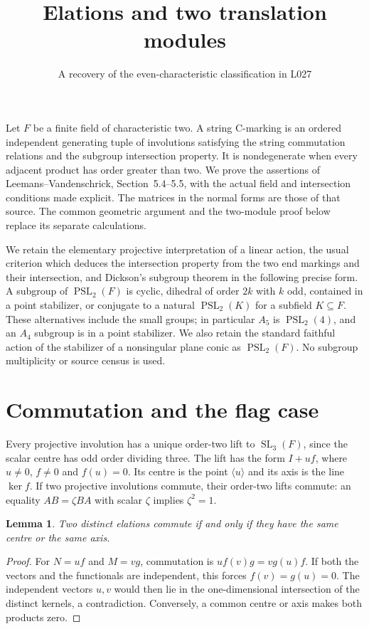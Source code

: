 \documentclass[11pt]{article}
\title{Elations and two translation modules}
\author{A recovery of the even-characteristic classification in L027}
\date{}
\newtheorem{lemma}[theorem]{Lemma}
\newcommand{\PSL}{\operatorname{PSL}}
\newcommand{\SL}{\operatorname{SL}}
\begin{document}
\maketitle
Let $F$ be a finite field of characteristic two. A string C-marking is an
ordered independent generating tuple of involutions satisfying the string
commutation relations and the subgroup intersection property. It is
nondegenerate when every adjacent product has order greater than two.
We prove the assertions of Leemans--Vandenschrick, Section~5.4--5.5, with
the actual field and intersection conditions made explicit. The matrices
in the normal forms are those of that source. The common geometric
argument and the two-module proof below replace its separate calculations.

We retain the elementary projective interpretation of a linear action,
the usual criterion which deduces the intersection property from the two
end markings and their intersection, and Dickson's subgroup theorem in
the following precise form. A subgroup of $\PSL_2(F)$ is cyclic,
dihedral of order $2k$ with $k$ odd, contained in a point stabilizer, or
conjugate to a natural $\PSL_2(K)$ for a subfield $K\subseteq F$.
These alternatives include the small groups; in particular $A_5$ is
$\PSL_2(4)$, and an $A_4$ subgroup is in a point stabilizer. We also
retain the standard faithful action of the stabilizer of a nonsingular
plane conic as $\PSL_2(F)$. No subgroup multiplicity or source census
is used.

\section*{Commutation and the flag case}
Every projective involution has a unique order-two lift to $\SL_3(F)$,
since the scalar centre has odd order dividing three. The lift has the
form $I+u f$, where $u\ne0$, $f\ne0$ and $f(u)=0$. Its centre is the
point $\langle u\rangle$ and its axis is the line $\ker f$.
If two projective involutions commute, their order-two lifts commute:
an equality $AB=\zeta BA$ with scalar $\zeta$ implies $\zeta^2=1$.

\begin{lemma}\label{commute}
Two distinct elations commute if and only if they have the same centre
or the same axis.
\end{lemma}
\begin{proof}
For $N=u f$ and $M=v g$, commutation is
$u f(v)g=v g(u)f$. If both the vectors and the functionals are independent,
this forces $f(v)=g(u)=0$. The independent vectors $u,v$ would then lie in
the one-dimensional intersection of the distinct kernels, a contradiction.
Conversely, a common centre or axis makes both products zero.
\end{proof}
\end{document}
